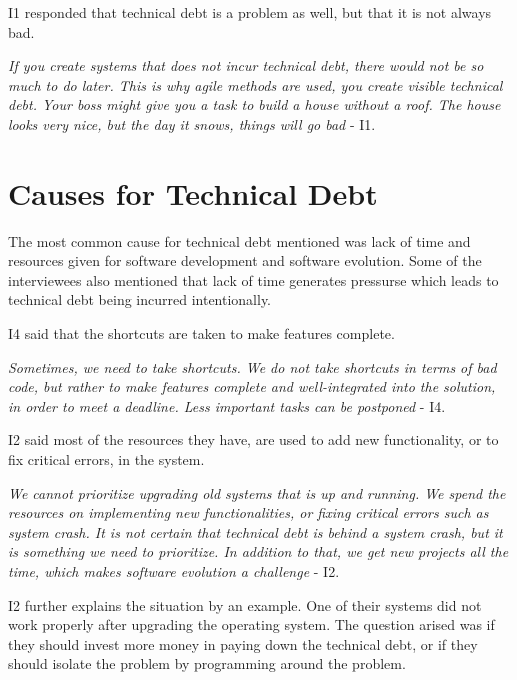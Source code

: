 I1 responded that technical debt is a problem as well, but that it is not always bad. 
\begin{displayquote}
\textit{If you create systems that does not incur technical debt, there would not be so much to do later. This is why agile methods are used, you create visible technical debt. Your boss might give you a task to build a house without a roof. The house looks very nice, but the day it snows, things will go bad} - I1.
\end{displayquote}






\section{Causes for Technical Debt}
The most common cause for technical debt mentioned was lack of time and resources given for software development and software evolution. Some of the interviewees also mentioned that lack of time generates pressurse which leads to technical debt being incurred intentionally. 

I4 said that the shortcuts are taken to make features complete. 
\begin{displayquote}
\textit{Sometimes, we need to take shortcuts. We do not take shortcuts in terms of bad code, but rather to make features complete and well-integrated into the solution, in order to meet a deadline. Less important tasks can be postponed} - I4.
\end{displayquote}

I2 said most of the resources they have, are used to add new functionality, or to fix critical errors, in the system.

\begin{displayquote}
\textit{We cannot prioritize upgrading old systems that is up and running. We spend the resources on implementing new functionalities, or fixing critical errors such as system crash. It is not certain that technical debt is behind a system crash, but it is something we need to prioritize. In addition to that, we get new projects all the time, which makes software evolution a challenge} - I2.
\end{displayquote} 

I2 further explains the situation by an example. One of their systems did not work properly after upgrading the operating system. The question arised was if they should invest more money in paying down the technical debt, or if they should isolate the problem by programming around the problem.

